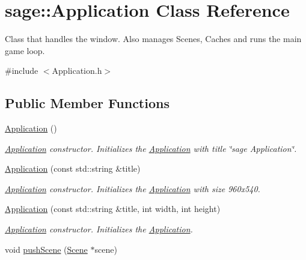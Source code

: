 \hypertarget{classsage_1_1Application}{}\section{sage\+::Application Class Reference}
\label{classsage_1_1Application}


Class that handles the window. Also manages Scenes, Caches and runs the main game loop.  




{\ttfamily \#include $<$Application.\+h$>$}

\subsection*{Public Member Functions}
\begin{DoxyCompactItemize}
\item 
\mbox{\hyperlink{classsage_1_1Application_afa8cc05ce6b6092be5ecdfdae44e05f8}{Application}} ()
\begin{DoxyCompactList}\small\item\em \mbox{\hyperlink{classsage_1_1Application}{Application}} constructor. Initializes the \mbox{\hyperlink{classsage_1_1Application}{Application}} with title \char`\"{}sage Application\char`\"{}. \end{DoxyCompactList}\item 
\mbox{\hyperlink{classsage_1_1Application_a357c8d817e692dae201b5b29148ad74d}{Application}} (const std\+::string \&title)
\begin{DoxyCompactList}\small\item\em \mbox{\hyperlink{classsage_1_1Application}{Application}} constructor. Initializes the \mbox{\hyperlink{classsage_1_1Application}{Application}} with size 960x540. \end{DoxyCompactList}\item 
\mbox{\hyperlink{classsage_1_1Application_ac7fce9bde96a86a6d26618a34cb09fa5}{Application}} (const std\+::string \&title, int width, int height)
\begin{DoxyCompactList}\small\item\em \mbox{\hyperlink{classsage_1_1Application}{Application}} constructor. Initializes the \mbox{\hyperlink{classsage_1_1Application}{Application}}. \end{DoxyCompactList}\item 
void \mbox{\hyperlink{classsage_1_1Application_ad69ba03dafa5afd69f2d6eb2a9d5fad5}{push\+Scene}} (\mbox{\hyperlink{classsage_1_1Scene}{Scene}} $\ast$scene)

\end{DoxyCompactItemize}
